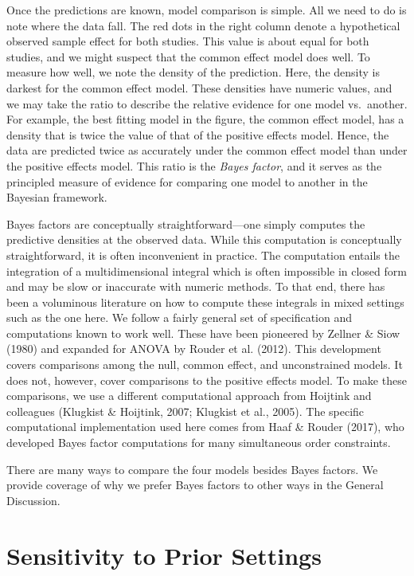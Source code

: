 \documentclass[english,man]{apa6}
\theoremstyle{definition}
\theoremstyle{definition}
\theoremstyle{remark}
\begin{document}
Once the predictions are known, model comparison is simple. All we need
to do is note where the data fall. The red dots in the right column
denote a hypothetical observed sample effect for both studies. This
value is about equal for both studies, and we might suspect that the
common effect model does well. To measure how well, we note the density
of the prediction. Here, the density is darkest for the common effect
model. These densities have numeric values, and we may take the ratio to
describe the relative evidence for one model vs.~another. For example,
the best fitting model in the figure, the common effect model, has a
density that is twice the value of that of the positive effects model.
Hence, the data are predicted twice as accurately under the common
effect model than under the positive effects model. This ratio is the
\emph{Bayes factor}, and it serves as the principled measure of evidence
for comparing one model to another in the Bayesian framework.

Bayes factors are conceptually straightforward---one simply computes the
predictive densities at the observed data. While this computation is
conceptually straightforward, it is often inconvenient in practice. The
computation entails the integration of a multidimensional integral which
is often impossible in closed form and may be slow or inaccurate with
numeric methods. To that end, there has been a voluminous literature on
how to compute these integrals in mixed settings such as the one here.
We follow a fairly general set of specification and computations known
to work well. These have been pioneered by Zellner \& Siow (1980) and
expanded for ANOVA by Rouder et al. (2012). This development covers
comparisons among the null, common effect, and unconstrained models. It
does not, however, cover comparisons to the positive effects model. To
make these comparisons, we use a different computational approach from
Hoijtink and colleagues (Klugkist \& Hoijtink, 2007; Klugkist et al.,
2005). The specific computational implementation used here comes from
Haaf \& Rouder (2017), who developed Bayes factor computations for many
simultaneous order constraints.

There are many ways to compare the four models besides Bayes factors. We
provide coverage of why we prefer Bayes factors to other ways in the
General Discussion.

\section{Sensitivity to Prior
Settings}\label{sensitivity-to-prior-settings}
\end{document}
